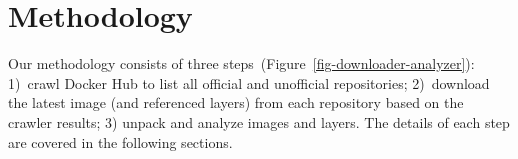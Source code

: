 \section{Methodology}
\label{sec:methodology}



Our methodology consists of three steps~(Figure~\ref{fig-downloader-analyzer}):
1)~crawl Docker Hub to list all official and unofficial repositories;
2)~download the latest image (and referenced layers) from each repository based
on the crawler results; 3) unpack and analyze images and layers.
%
%
%
%
The details of each step are covered in the following sections.
%
%
%
%


